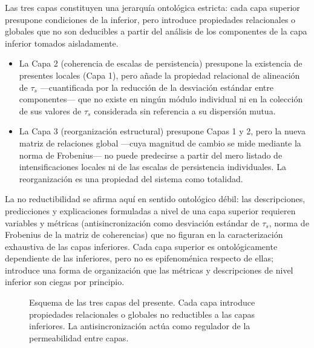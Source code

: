 Las tres capas constituyen una jerarquía ontológica estricta: cada capa superior presupone condiciones de la inferior, pero introduce propiedades relacionales o globales que no son deducibles a partir del análisis de los componentes de la capa inferior tomados aisladamente.

\begin{itemize}
    \item La Capa 2 (coherencia de escalas de persistencia) presupone la existencia de presentes locales (Capa 1), pero añade la propiedad relacional de alineación de $\tau_s$ —cuantificada por la reducción de la desviación estándar entre componentes— que no existe en ningún módulo individual ni en la colección de sus valores de $\tau_s$ considerada sin referencia a su dispersión mutua.
    \item La Capa 3 (reorganización estructural) presupone Capas 1 y 2, pero la nueva matriz de relaciones global —cuya magnitud de cambio se mide mediante la norma de Frobenius— no puede predecirse a partir del mero listado de intensificaciones locales ni de las escalas de persistencia individuales. La reorganización es una propiedad del sistema como totalidad.
\end{itemize}

La no reductibilidad se afirma aquí en sentido ontológico débil: las descripciones, predicciones y explicaciones formuladas a nivel de una capa superior requieren variables y métricas (antisincronización como desviación estándar de $\tau_s$, norma de Frobenius de la matriz de coherencias) que no figuran en la caracterización exhaustiva de las capas inferiores. Cada capa superior es ontológicamente dependiente de las inferiores, pero no es epifenoménica respecto de ellas; introduce una forma de organización que las métricas y descripciones de nivel inferior son ciegas por principio.

\begin{figure}[htbp]
\centering
{}
\caption{Esquema de las tres capas del presente. Cada capa introduce propiedades relacionales o globales no reductibles a las capas inferiores. La antisincronización actúa como regulador de la permeabilidad entre capas.}
\label{fig:capas}
\end{figure}